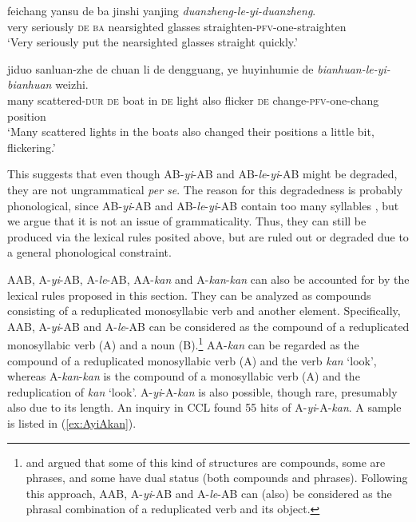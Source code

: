 \documentclass[11pt,a4paper,fleqn,draft]{article}
\let\textbf\emph
\begin{document}
 \ex\label{ex:AByiAB-li}
 \gll feichang yansu de ba jinshi yanjing \textbf{duanzheng-le-yi-duanzheng}.\footnotemark\\
 very seriously \textsc{de} \textsc{ba} nearsighted glasses straighten-\textsc{pfv}-one-straighten\\
 \glt `Very seriously put the nearsighted glasses straight quickly.'
 
 \ex\label{ex:ABleyiAB-ccl}
 \gll jiduo sanluan-zhe de chuan li de dengguang, ye huyinhumie de \textbf{bianhuan-le-yi-bianhuan} weizhi.\\
  many scattered-\textsc{dur} \textsc{de} boat in \textsc{de} light also flicker \textsc{de} change-\textsc{pfv}-one-chang position\\ 
 \glt `Many scattered lights in the boats also changed their positions a little bit, flickering.'
 \z
\z

This suggests that  even though AB-\emph{yi}-AB and AB-\emph{le}-\emph{yi}-AB might be degraded, they are not ungrammatical \emph{per se}.
The reason for this degradedness is probably phonological, since AB-\emph{yi}-AB and AB-\emph{le}-\emph{yi}-AB contain too many syllables \citetext{\citealp[274]{Fan1964}, \citealp[143]{Sui2018}, \citealp[239]{YangWei2017}, \citealp[15]{Zhang2000}}, but we argue that it is not an issue of grammaticality.
Thus, they can still be produced via the lexical rules posited above, but are ruled out or degraded due to a general phonological constraint.


AAB, A-\emph{yi}-AB, A-\emph{le}-AB, AA-\emph{kan} and A-\emph{kan}-\emph{kan} can also be accounted for by the lexical rules proposed in this section.
They can be analyzed as compounds consisting of a reduplicated monosyllabic verb and another element.
Specifically, AAB, A-\emph{yi}-AB and A-\emph{le}-AB can be considered as the compound of a reduplicated monosyllabic verb (A) and a noun (B).\footnote{
\citet{Huang1984} and \citet{Her1996, Her2010} argued that some of this kind of structures are compounds, some are phrases, and some have dual status (both compounds and phrases).
Following this approach, AAB, A-\emph{yi}-AB and A-\emph{le}-AB can (also) be considered as the phrasal combination of a reduplicated verb and its object.
}
AA-\emph{kan} can be regarded as the compound of a reduplicated monosyllabic verb (A) and the verb \emph{kan} `look',
whereas A-\emph{kan}-\emph{kan} is the compound of a monosyllabic verb (A) and the reduplication of \emph{kan} `look'.
A-\emph{yi}-A-\emph{kan} is also possible, though rare, presumably also due to its length.
An inquiry in CCL found 55 hits of A-\emph{yi}-A-\emph{kan}.
A sample is listed in (\ref{ex:AyiAkan}).
\end{document}
